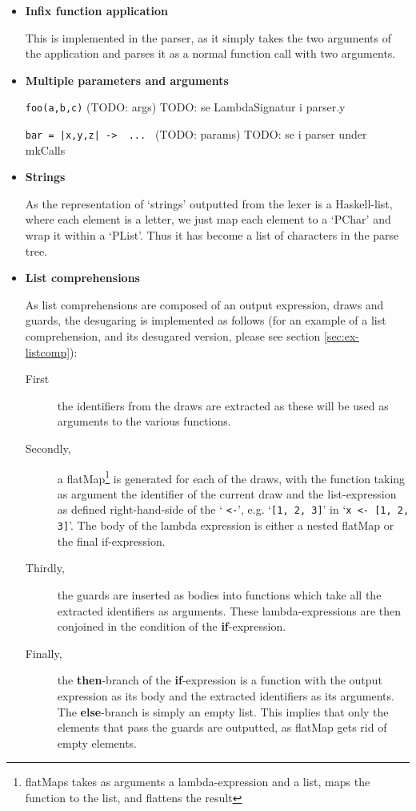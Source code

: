 \begin{itemize}
  \item \textbf{Infix function application}

    This is implemented in the parser, as it simply takes the two arguments of the application and parses it as a normal function call with two arguments.

  \item \textbf{Multiple parameters and arguments}

    \texttt{foo(a,b,c)} (TODO: args) TODO: se LambdaSignatur i parser.y

    \texttt{bar = |x,y,z| -> { ... }} (TODO: params) TODO: se i parser under mkCalls



  \item \textbf{Strings}

    As the representation of `strings' outputted from the lexer is a Haskell-list, where each element is a letter, we just map each element to a `PChar' and wrap it within a `PList'. Thus it has become a list of characters in the parse tree.

  \item \textbf{List comprehensions}

    As list comprehensions are composed of an output expression, draws and guards, the desugaring is implemented as follows (for an example of a list comprehension, and its desugared version,  please see section \ref{sec:ex-listcomp}):
    \begin{description}
      \item[First] the identifiers from the draws are extracted as these will be used as arguments to the various functions.
      \item[Secondly,] a flatMap\footnote{flatMaps takes as arguments a lambda-expression and a list, maps the function to the list, and flattens the result} is generated for each of the draws, with the function taking as argument the identifier of the current draw and the list-expression as defined right-hand-side of the ` \texttt{<-}', e.g. `\texttt{[1, 2, 3]}' in `\texttt{x <- [1, 2, 3]}'. The body of the lambda expression is either a nested flatMap or the final if-expression.
        \item[Thirdly,] the guards are inserted as bodies into functions which take all the extracted identifiers as arguments. These lambda-expressions are then conjoined in the condition of the \textbf{if}-expression.
      \item[Finally,] the \textbf{then}-branch of the \textbf{if}-expression is a function with the output expression as its body and the extracted identifiers as its arguments. The \textbf{else}-branch is simply an empty list. This implies that only the elements that pass the guards are outputted, as flatMap gets rid of empty elements.
    \end{description}


\end{itemize}

